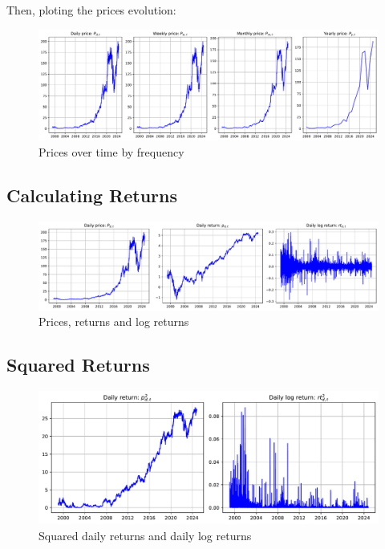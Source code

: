\documentclass{article}
\begin{document}
Then, ploting the prices evolution:

\begin{figure}[H]
    \centering
    \includegraphics[width=\textwidth]{Img/prices_time.pdf}
    \caption{Prices over time by frequency}
    \label{fig:prices_time}
\end{figure}

\subsection{Calculating Returns}

\begin{figure}[H]
    \centering
    \includegraphics[width=\textwidth]{Img/log_returns.pdf}
    \caption{Prices, returns and log returns}
    \label{fig:log_returns}
\end{figure}

\subsection{Squared Returns}

\begin{figure}[H]
    \centering
    \includegraphics[width=\textwidth]{Img/squared_log_returns.pdf}
    \caption{Squared daily returns and daily log returns}
    \label{fig:squared_logreturns}
\end{figure}
\end{document}
